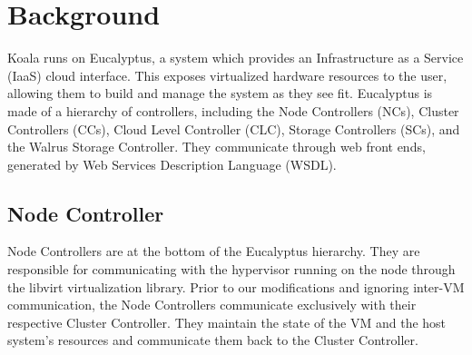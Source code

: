 \section{Background}

Koala runs on Eucalyptus, a system which provides an Infrastructure as a Service (IaaS) cloud interface.  This exposes virtualized hardware resources to the user, allowing them to build and manage the system as they see fit.  Eucalyptus is made of a hierarchy of controllers, including the Node Controllers (NCs), Cluster Controllers (CCs), Cloud Level Controller (CLC), Storage Controllers (SCs), and the Walrus Storage Controller.  They communicate through web front ends, generated by Web Services Description Language (WSDL).

\subsection{Node Controller}
Node Controllers are at the bottom of the Eucalyptus hierarchy.  They are responsible for communicating with the hypervisor running on the node through the libvirt virtualization library.  Prior to our modifications and ignoring inter-VM communication, the Node Controllers communicate exclusively with their respective Cluster Controller.  They maintain the state of the VM and the host system's resources and communicate them back to the Cluster Controller.



